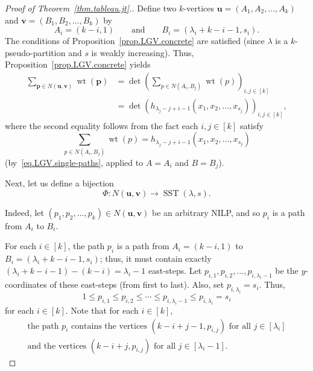 \documentclass[reqno]{amsart}
\newcommand{\0}{\phantom{c}}
\DeclareMathOperator{\wt}{wt} %
\DeclareMathOperator{\SST}{SST} %
\newcommand{\pp}{\mathbf{p}}
\newcommand{\uu}{\mathbf{u}}
\newcommand{\vv}{\mathbf{v}}
\let\sumnonlimits\sum
\renewcommand{\sum}{\sumnonlimits\limits}
\newcommand{\tup}[1]{\left( #1 \right)}
\newcommand{\ive}[1]{\left[ #1 \right]}
\theoremstyle{plain}
\theoremstyle{definition}
\numberwithin{equation}{section}
\begin{document}
\begin{proof}[Proof of Theorem~\ref{thm.tableau.jt}.]
Define two $k$-vertices $\uu = \tup{A_1, A_2, \dotsc, A_k}$ and $\vv = \tup{B_1, B_2, \dotsc, B_k}$ by
\[
A_i = (k-i,1)  \qquad \text{and} \qquad B_i = (\lambda_i+k-i-1, s_i).
\]
The conditions of Proposition~\ref{prop.LGV.concrete} are satisfied (since $\lambda$ is a $k$-pseudo-partition and $s$ is weakly increasing).
Thus, Proposition~\ref{prop.LGV.concrete} yields
\begin{equation}
\label{pf.thm.tableau.jt.1}
\begin{split}
\sum_{\pp \in N(\uu,\vv)} \wt(\pp) & = \det\left(  \sum_{p \in  N(A_i,B_j)}\wt(p) \right)_{i, j \in \ive{k}} \\
& = \det\left( h_{\lambda_j-j+i-1}(x_1, x_2, \dotsc, x_{s_j}) \right)_{i, j \in \ive{k}},
\end{split}
\end{equation}
where the second equality follows from the fact each $i,j \in \ive{k}$ satisfy
\[
\sum_{p \in N(A_i,B_j)} \wt(p) = h_{\lambda_j-j+i-1}(x_1, x_2, \dotsc, x_{s_j})
\]
(by~\eqref{eq.LGV.single-paths}, applied to $A = A_i$ and $B = B_j$). 

Next, let us define a bijection
\[
\Phi \colon N(\uu, \vv) \to \SST(\lambda, s).
\]

Indeed, let $\tup{p_1, p_2, \dotsc, p_k} \in N(\uu,\vv)$ be an arbitrary NILP, and so $p_i$ is a path from $A_i$ to $B_i$.

For each $i \in \ive{k}$, the path $p_i$ is a path from $A_i = (k-i, 1)$ to $B_i = (\lambda_i+k-i-1,s_i)$; thus, it must contain exactly $(\lambda_i+k-i-1) - (k-i) = \lambda_i - 1$ east-steps.
Let $p_{i,1},p_{i,2}, \dotsc, p_{i,\lambda_i-1}$ be the $y$-coordinates of these east-steps (from first to last).
Also, set $p_{i,\lambda_i} = s_i$.
Thus,
\begin{equation}
\label{pf.thm.tableau.jt.row-weak}
1 \leq p_{i,1} \leq p_{i,2} \leq \cdots \leq p_{i,\lambda_i-1} \leq p_{i,\lambda_i} = s_i
\end{equation}
for each $i \in \ive{k}$.
Note that for each $i \in \ive{k}$,
\begin{subequations}
\begin{gather}
\label{pf.thm.tableau.jt.pi-vert-1}
\text{the path }p_i\text{ contains the vertices } (k-i+j-1, p_{i,j})  \text{ for all } j \in \ive{\lambda_i}
\\
\label{pf.thm.tableau.jt.pi-vert-2}
\text{and the vertices } (k-i+j, p_{i,j}) \text{ for all } j \in \ive{\lambda_i-1}.
\end{gather}
\end{subequations}


\end{proof}
\end{document}
